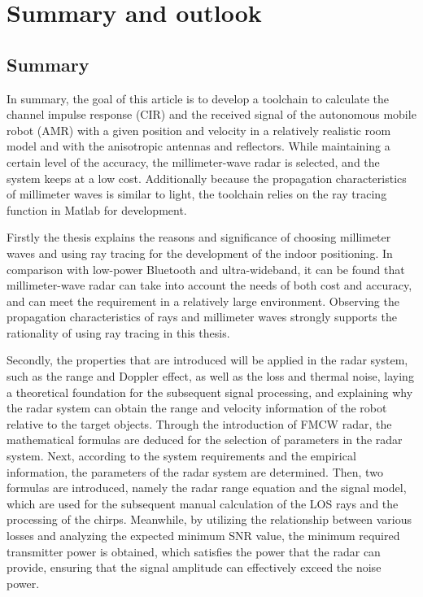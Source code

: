 \documentclass[12pt,DIV14,BCOR12mm,a4paper,footinclude=false,headinclude,parskip=half-,twoside,openright,cleardoublepage=empty,toc=index,bibliography=totoc,listof=totoc]{scrreprt}
\numberwithin{equation}{chapter}
\begin{document}
\chapter{Summary and outlook} \label{Summary and outlook}

\section{Summary} \label{summary}

In summary, the goal of this article is to develop a toolchain to calculate the channel impulse response (CIR) and the received signal of the autonomous mobile robot (AMR) with a given position and velocity in a relatively realistic room model and with the anisotropic antennas and reflectors. While maintaining a certain level of the accuracy, the millimeter-wave radar is selected, and the system keeps at a low cost. Additionally because the propagation characteristics of millimeter waves is similar to light, the toolchain relies on the ray tracing function in Matlab for development.

Firstly the thesis explains the reasons and significance of choosing millimeter waves and using ray tracing for the development of the indoor positioning. In comparison with low-power Bluetooth and ultra-wideband, it can be found that millimeter-wave radar can take into account the needs of both cost and accuracy, and can meet the requirement in a relatively large environment. Observing the propagation characteristics of rays and millimeter waves strongly supports the rationality of using ray tracing in this thesis.

Secondly, the properties that are introduced will be applied in the radar system, such as the range and Doppler effect, as well as the loss and thermal noise, laying a theoretical foundation for the subsequent signal processing, and explaining why the radar system can obtain the range and velocity information of the robot relative to the target objects. Through the introduction of FMCW radar, the mathematical formulas are deduced for the selection of parameters in the radar system. Next, according to the system requirements and the empirical information, the parameters of the radar system are determined. Then, two formulas are introduced, namely the radar range equation and the signal model, which are used for the subsequent manual calculation of the LOS rays and the processing of the chirps. Meanwhile, by utilizing the relationship between various losses and analyzing the expected minimum SNR value, the minimum required transmitter power is obtained, which satisfies the power that the radar can provide, ensuring that the signal amplitude can effectively exceed the noise power.
\end{document}
